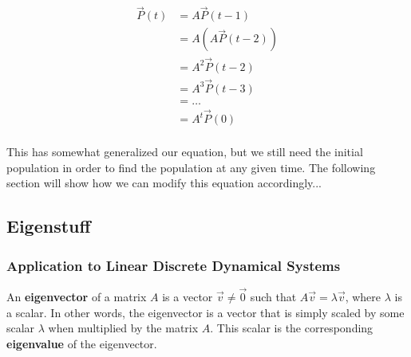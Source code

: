 \documentclass[12pt]{article}
\begin{document}
{\begin{equation}\label{eqn:poft}
    \begin{split}
        \vec{P}(t) &= A\vec{P}(t-1)\\
        &= A(A\vec{P}(t-2))\\
        &= A^2\vec{P}(t-2)\\
        &= A^3\vec{P}(t-3)\\
        &= \dots\\
        &= A^t\vec{P}(0)\\
    \end{split}
\end{equation}

This has somewhat generalized our equation, but we still need the initial population in order to find the population at any given time. The following section will show how we can modify this equation accordingly...

\subsection{Eigenstuff}
\subsubsection{Application to Linear Discrete Dynamical Systems}
An \textbf{eigenvector} of a matrix $A$ is a vector $\vec{v} \neq \vec{0}$ such that $A\vec{v} = \lambda\vec{v}$, where $\lambda$ is a scalar. In other words, the eigenvector is a vector that is simply scaled by some scalar $\lambda$ when multiplied by the matrix $A$. This scalar is the corresponding \textbf{eigenvalue} of the eigenvector.

}
\end{document}
